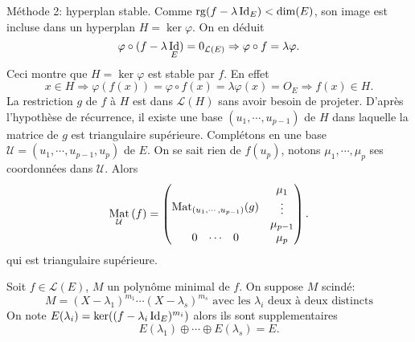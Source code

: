 \begin{demo}
Méthode 2: hyperplan stable.\newline
Comme $\mathop{\mathrm{rg}}(f - \lambda \mathop{\mathrm{Id}}_E) < \dim(E)$, son image est incluse dans un hyperplan $H = \ker \varphi$. On en déduit
\[
  \varphi \circ (f - \lambda \mathop{\mathrm{Id}}_E) = 0_{\mathcal{L}(E)} \Rightarrow \varphi \circ f = \lambda \varphi.
\]
Ceci montre que $H = \ker \varphi$ est stable par $f$. En effet
\[
  x\in H \Rightarrow \varphi(f(x)) = \varphi \circ f(x) = \lambda \varphi(x) = O_E \Rightarrow f(x) \in H.
\]
La restriction $g$ de $f$ à $H$ est dans $\mathcal{L}(H)$ sans avoir besoin de projeter. D'après l'hypothèse de récurrence, il existe une base $(u_1, \cdots,u_{p-1})$ de $H$ dans laquelle la matrice de $g$ est triangulaire supérieure. Complétons en une base $\mathcal{U} = (u_1,\cdots, u_{p-1},u_p)$ de $E$. On se sait rien de $f(u_p)$, notons $\mu_1, \cdots, \mu_p$ ses coordonnées dans $\mathcal{U}$. Alors
\[
  \mathop{\mathrm{Mat}}_{\mathcal{U}}\left( f\right)=
  \begin{pmatrix}
    \mathop{\mathrm{Mat}}_{(u_1, \cdots, u_{p-1})}(g)          & \begin{matrix} \mu_1 \\ \vdots \\ \mu_{p-1}\end{matrix} \\
    \begin{matrix} 0 & \cdots & 0\end{matrix} & \mu_p
  \end{pmatrix}.
\]
qui est triangulaire supérieure.
\end{demo}
\begin{propn} \label{caracsupp}
  Soit $f\in \mathcal{L}(E)$, $M$ un polynôme minimal de $f$. On suppose $M$ scindé:
\[
  M = (X - \lambda_1)^{m_1} \cdots (X - \lambda_s)^{m_s} \text{ avec les $\lambda_i$ deux à deux distincts}
\]
On note $E(\lambda_i) = \ker((f - \lambda_i \mathop{\mathrm{Id}}_E)^{m_i})$ alors ils sont supplementaires
\[
  E(\lambda_1) \oplus \cdots \oplus E(\lambda_s) = E.
\]
\end{propn}
